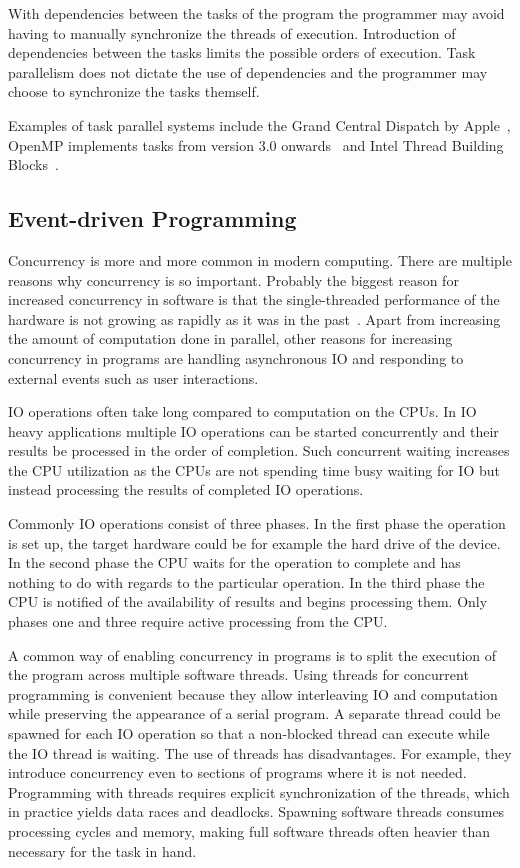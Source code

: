With dependencies between the tasks of the program the programmer may avoid having to manually synchronize the threads of execution. Introduction of dependencies between the tasks limits the possible orders of execution. Task parallelism does not dictate the use of dependencies and the programmer may choose to synchronize the tasks themself.~\cite{hennessy2011computer}

Examples of task parallel systems include the Grand Central Dispatch by Apple~\cite{sakamoto2012grand}, OpenMP implements tasks from version 3.0 onwards~\cite{ayguade2009design} and Intel Thread Building Blocks~\cite{pheatt2008intel}.

\subsection{Event-driven Programming}
\label{subsec:event-driven-programming}
Concurrency is more and more common in modern computing. There are multiple reasons why concurrency is so important. Probably the biggest reason for increased concurrency in software is that the single-threaded performance of the hardware is not growing as rapidly as it was in the past~\cite{sutter2005free}. Apart from increasing the amount of computation done in parallel, other reasons for increasing concurrency in programs are handling asynchronous IO and responding to external events such as user interactions.

IO operations often take long compared to computation on the CPUs. In IO heavy applications multiple IO operations can be started concurrently and their results be processed in the order of completion. Such concurrent waiting increases the CPU utilization as the CPUs are not spending time busy waiting for IO but instead processing the results of completed IO operations.~\cite{dabek2002event}

Commonly IO operations consist of three phases. In the first phase the operation is set up, the target hardware could be for example the hard drive of the device. In the second phase the CPU waits for the operation to complete and has nothing to do with regards to the particular operation. In the third phase the CPU is notified of the availability of results and begins processing them. Only phases one and three require active processing from the CPU.~\cite{friesen2015asynchronous}

A common way of enabling concurrency in programs is to split the execution of the program across multiple software threads. Using threads for concurrent programming is convenient because they allow interleaving IO and computation while preserving the appearance of a serial program. A separate thread could be spawned for each IO operation so that a non-blocked thread can execute while the IO thread is waiting. The use of threads has disadvantages. For example, they introduce concurrency even to sections of programs where it is not needed. Programming with threads requires explicit synchronization of the threads, which in practice yields data races and deadlocks. Spawning software threads consumes processing cycles and memory, making full software threads often heavier than necessary for the task in hand.~\cite{dabek2002event, lee2006problem}

